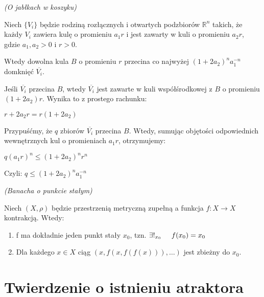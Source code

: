 \documentclass{mini}
\begin{document}
\begin{tw}{\textit{(O jabłkach w koszyku)}}\label{apple}

Niech $\lbrace V_i \rbrace$ będzie rodziną rozłącznych i otwartych podzbiorów $\mathbb{R}^n$ takich, że każdy $V_i$ zawiera kulę o promieniu $a_1r$ i jest zawarty w kuli o promieniu $a_2r$, gdzie $a_1, a_2>0$ i $r>0$.

Wtedy dowolna kula $B$ o promieniu $r$ przecina co najwyżej $(1+2a_2)^n a_1^{-n}$ domknięć $\overline{V_i}$.

\end{tw}


\begin{dow}

Jeśli $\overline{V_i}$ przecina $B$, wtedy $\overline{V_i}$ jest zawarte w kuli współśrodkowej z $B$ o promieniu $(1+2a_2)r$. Wynika to z prostego rachunku: 

$r+2a_2r = r(1+2a_2)$

Przypuśćmy, że $q$ zbiorów $\overline{V_i}$ przecina $B$. Wtedy, sumując objętości odpowiednich wewnętrznych kul o promieniach $a_1r$, otrzymujemy:

$q(a_1r)^n \leqslant (1+2a_2)^nr^n$

Czyli: $q \leqslant (1+2a_2)^n a_1^{-n}$
 
\end{dow}


\begin{tw}{\textit{(Banacha o punkcie stałym)}}\label{banach}

Niech $(X,\rho)$ będzie przestrzenią metryczną zupełną a funkcja $f: X\longrightarrow X$ kontrakcją. Wtedy:
\begin{enumerate}
\item f ma dokładnie jeden punkt stały $x_0$, tzn. $\exists !_{x_0} \hspace{5mm}f(x_0)=x_0$
\item Dla każdego $x \in X$ ciąg $(x,f(x,f(f(x))),\ldots)$ jest zbieżny do $x_0$.
\end{enumerate}

\end{tw}

\chapter{Twierdzenie o istnieniu atraktora}
\end{document}
